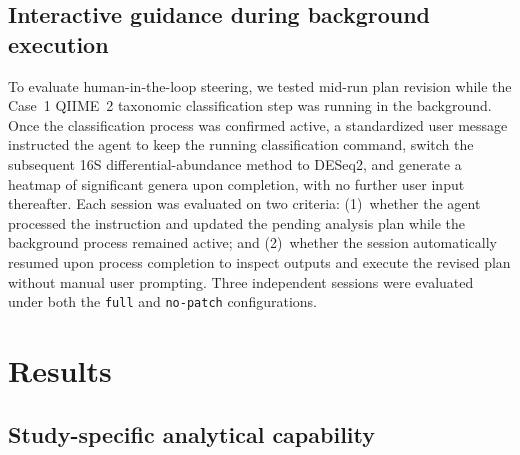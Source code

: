 \documentclass[10pt,letterpaper]{article}
\begin{document}
\subsection{Interactive guidance during background execution}

To evaluate human-in-the-loop steering, we tested mid-run plan revision while
the Case~1 QIIME~2 taxonomic classification step was running in the background.
Once the classification process was confirmed active, a standardized user
message instructed the agent to keep the running classification command, switch
the subsequent 16S differential-abundance method to DESeq2, and generate a
heatmap of significant genera upon completion, with no further user input
thereafter. Each session was evaluated on two criteria: (1)~whether the agent
processed the instruction and updated the pending analysis plan while the
background process remained active; and (2)~whether the session automatically
resumed upon process completion to inspect outputs and execute the revised plan
without manual user prompting. Three independent sessions were evaluated under
both the \texttt{full} and \texttt{no-patch} configurations.

\section{Results}

\subsection{Study-specific analytical capability}
\end{document}

